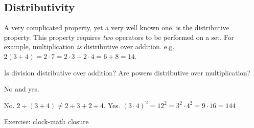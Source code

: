 \subsection{Distributivity}
A very complicated property, yet a very well known one, is the distributive property.  This property
requires \emph{two} operators to be performed on a set.  For example, multiplication \emph{is}
distributive over addition.  e.g. $2(3+4) = 2\cdot7 = 2\cdot3 + 2\cdot4 = 6 + 8 = 14$.

\begin{example}
\exProblem
Is division distributive over addition?  Are powers distributive over multiplication?

\exSolution
No and yes.

No.  $2\div(3+4) \ne 2\div3 + 2\div4$.
Yes.  $(3\cdot4)^2 = 12^2 = 3^2\cdot4^2 = 9\cdot16 = 144$
\end{example}

Exercise: clock-math closure




